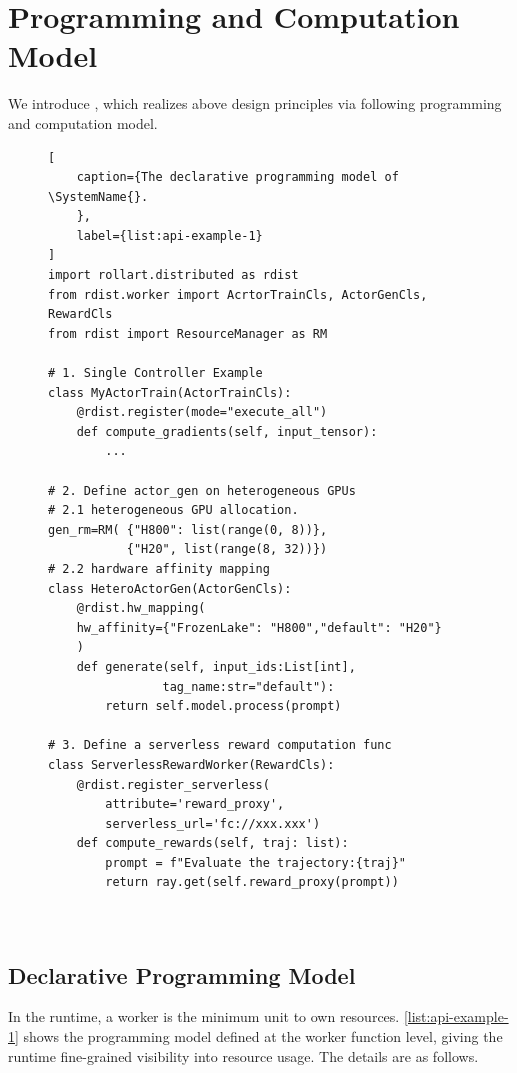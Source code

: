 \section{Programming and Computation Model}
\label{sec:programming-model}
We introduce \SystemName{}, which realizes above design principles via following programming and computation model. 




\begin{figure}[t]
\centering
\begin{lstlisting}[
    caption={The declarative programming model of \SystemName{}.
    },
    label={list:api-example-1}
]
import rollart.distributed as rdist
from rdist.worker import AcrtorTrainCls, ActorGenCls, RewardCls
from rdist import ResourceManager as RM

# 1. Single Controller Example
class MyActorTrain(ActorTrainCls):
    @rdist.register(mode="execute_all")
    def compute_gradients(self, input_tensor):
        ...

# 2. Define actor_gen on heterogeneous GPUs
# 2.1 heterogeneous GPU allocation. 
gen_rm=RM( {"H800": list(range(0, 8))},  
           {"H20", list(range(8, 32))})
# 2.2 hardware affinity mapping
class HeteroActorGen(ActorGenCls):
    @rdist.hw_mapping(
    hw_affinity={"FrozenLake": "H800","default": "H20"}
    )
    def generate(self, input_ids:List[int], 
                tag_name:str="default"):
        return self.model.process(prompt)

# 3. Define a serverless reward computation func
class ServerlessRewardWorker(RewardCls):
    @rdist.register_serverless(
        attribute='reward_proxy',
        serverless_url='fc://xxx.xxx')
    def compute_rewards(self, traj: list):
        prompt = f"Evaluate the trajectory:{traj}"
        return ray.get(self.reward_proxy(prompt))

    
\end{lstlisting}
\end{figure}




\subsection{Declarative Programming Model}
In the runtime, a worker is the minimum unit to own resources. \autoref{list:api-example-1} shows the programming model defined at the worker function level, giving the runtime fine-grained visibility into resource usage. The details are as follows.



